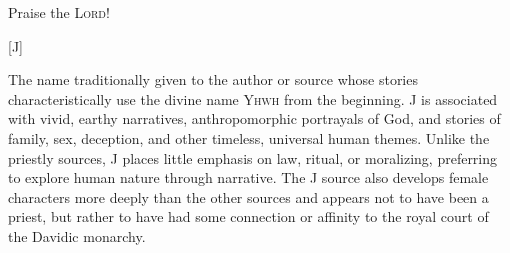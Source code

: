 

{
}
{
}
{
	Praise the \textsc{Lord}!
	

	\begin{together}[8][5000]
	{%
	The name traditionally given to the author or source whose stories
	characteristically use the divine name \textsc{Yhwh} from the beginning.
	J is associated with vivid, earthy narratives, anthropomorphic portrayals
	of God, and stories of family, sex, deception, and other timeless,
	universal human themes. Unlike the priestly sources, J places little
	emphasis on law, ritual, or moralizing, preferring to explore human nature
	through narrative. The J source also develops female characters more deeply
	than the other sources and appears not to have been a priest, but rather
	to have had some connection or affinity to the royal court of the Davidic
	monarchy.

}
\end{together}}
